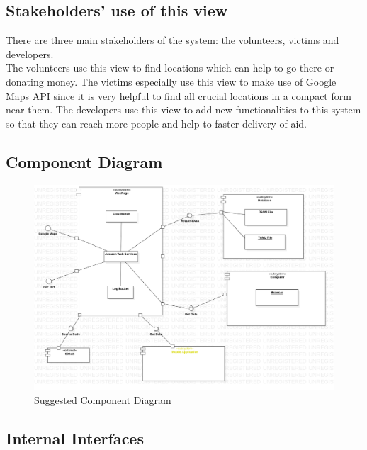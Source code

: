 \subsection{Stakeholders' use of this view}

There are three main stakeholders of the system: the volunteers, victims and developers. \\

The volunteers use this view to find locations which can help to go there or donating money.
The victims especially use this view to make use of Google Maps API since it is very helpful to find all crucial locations in a compact form near them.
The developers use this view to add new functionalities to this system so that they can reach more people and help to faster delivery of aid.

\subsection{Component Diagram}

\begin{figure}[H]
    \includegraphics[scale = 0.4]{assets/ComponentDiagramSuggestion.png}
    \caption[Suggested Component Diagram]{Suggested Component Diagram}
\end{figure}

\subsection{Internal Interfaces}

